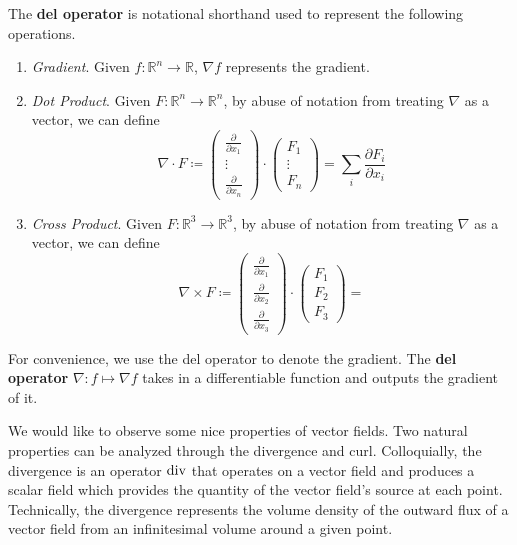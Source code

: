   \begin{definition}
    \label{def:del-operator}
		The \textbf{del operator} is notational shorthand used to represent the following operations. 
		\begin{enumerate}
			\item \textit{Gradient}. Given $f: \mathbb{R}^n \to \mathbb{R}$, $\nabla f$ represents the gradient. 

			\item \textit{Dot Product}. 
				Given $F: \mathbb{R}^n \to \mathbb{R}^n$, by abuse of notation from treating $\nabla$ as a vector, we can define 
				\begin{equation}
					\nabla \cdot F \coloneqq \begin{pmatrix} \frac{\partial}{\partial x_1} \\ \vdots \\ \frac{\partial}{\partial x_n} \end{pmatrix} \cdot \begin{pmatrix} F_1 \\ \vdots \\ F_n \end{pmatrix} = \sum_i \frac{\partial F_i}{\partial x_i}
				\end{equation}

				\item \textit{Cross Product}. Given $F: \mathbb{R}^3 \to \mathbb{R}^3$, by abuse of notation from treating $\nabla$ as a vector, we can define 
				\begin{equation}
					\nabla \times F \coloneqq \begin{pmatrix} \frac{\partial}{\partial x_1} \\ \frac{\partial}{\partial x_2} \\ \frac{\partial}{\partial x_3} \end{pmatrix} \cdot \begin{pmatrix} F_1 \\ F_2 \\ F_3 \end{pmatrix} = 
				\end{equation}
		\end{enumerate}

		For convenience, we use the del operator to denote the gradient. The \textbf{del operator} $\nabla: f \mapsto \nabla f$ takes in a differentiable function and outputs the gradient of it. 
  \end{definition}

  We would like to observe some nice properties of vector fields. Two natural properties can be analyzed through the divergence and curl. Colloquially, the divergence is an operator $\operatorname{div}$ that operates on a vector field and produces a scalar field which provides the quantity of the vector field's source at each point. Technically, the divergence represents the volume density of the outward flux of a vector field from an infinitesimal volume around a given point. 

